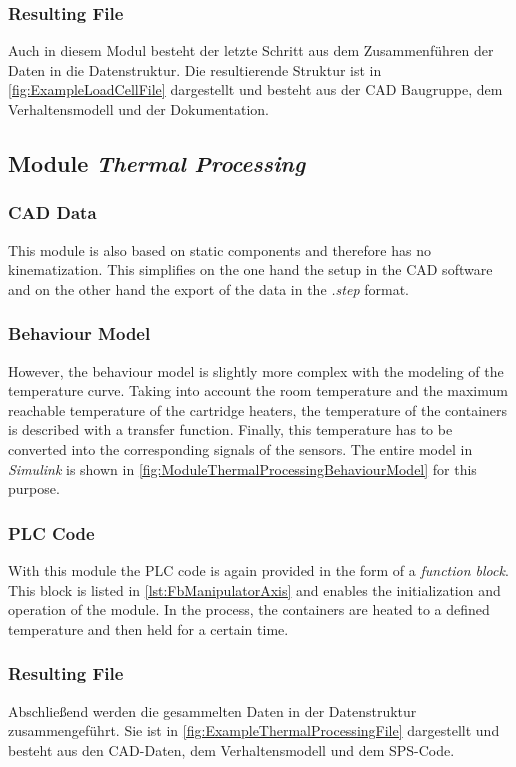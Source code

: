 	\subsubsection{Resulting File}
	Auch in diesem Modul besteht der letzte Schritt aus dem Zusammenführen der Daten in die Datenstruktur. Die resultierende Struktur ist in \autoref{fig:ExampleLoadCellFile} dargestellt und besteht aus der CAD Baugruppe, dem Verhaltensmodell und der Dokumentation. 

    
\subsection{Module \textit{Thermal Processing}}
    \subsubsection{CAD Data}
    This module is also based on static components and therefore has no kinematization. This simplifies on the one hand the setup in the CAD software and on the other hand the export of the data in the \textit{.step} format.
    
    \subsubsection{Behaviour Model}
    However, the behaviour model is slightly more complex with the modeling of the temperature curve. Taking into account the room temperature and the maximum reachable temperature of the cartridge heaters, the temperature of the containers is described with a transfer function. Finally, this temperature has to be converted into the corresponding signals of the sensors. The entire model in \textit{Simulink} is shown in \autoref{fig:ModuleThermalProcessingBehaviourModel} for this purpose. 
   
    
    \subsubsection{PLC Code}
    With this module the PLC code is again provided in the form of a \textit{function block}. This block is listed in \autoref{lst:FbManipulatorAxis} and enables the initialization and operation of the module. In the process, the containers are heated to a defined temperature and then held for a certain time. 
    
    
    \subsubsection{Resulting File}
    Abschließend werden die gesammelten Daten in der Datenstruktur zusammengeführt. Sie ist in \autoref{fig:ExampleThermalProcessingFile} dargestellt und besteht aus den CAD-Daten, dem Verhaltensmodell und dem SPS-Code.
	
